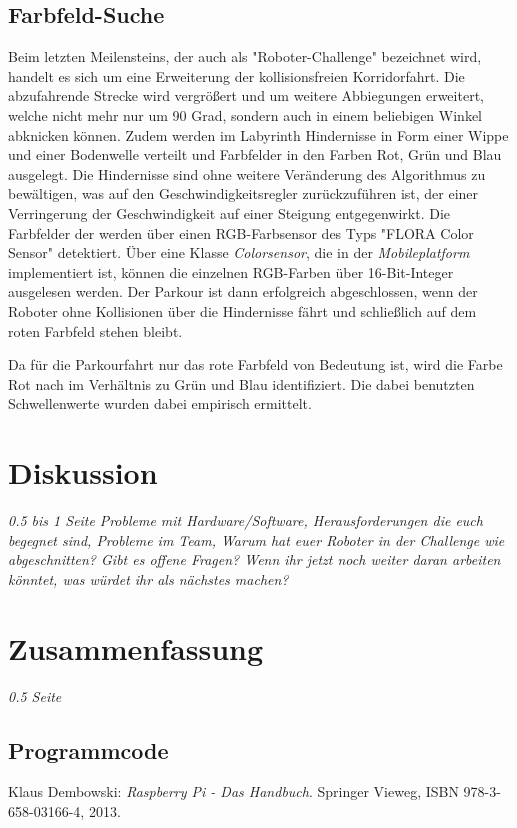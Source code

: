 \documentclass[12pt,a4paper,oneside]{article}
\begin{document}
\begin{spacing}{1.15}
\newpage

\subsection{Farbfeld-Suche}
	
Beim letzten Meilensteins, der auch als "Roboter-Challenge" bezeichnet wird, handelt es sich um eine Erweiterung der kollisionsfreien Korridorfahrt. Die abzufahrende Strecke wird vergrößert und um weitere Abbiegungen erweitert, welche nicht mehr nur um 90 Grad, sondern auch in einem beliebigen Winkel abknicken können. Zudem werden im Labyrinth Hindernisse in Form einer Wippe und einer Bodenwelle verteilt und Farbfelder in den Farben Rot, Grün und Blau ausgelegt. Die Hindernisse sind ohne weitere Veränderung des Algorithmus zu bewältigen, was auf den Geschwindigkeitsregler zurückzuführen ist, der einer Verringerung der Geschwindigkeit auf einer Steigung entgegenwirkt. Die Farbfelder der werden über einen RGB-Farbsensor des Typs "FLORA Color Sensor" detektiert. Über eine Klasse \textit{Colorsensor}, die in der \textit{Mobileplatform}  implementiert ist, können die einzelnen RGB-Farben über 16-Bit-Integer ausgelesen werden.
Der Parkour ist dann erfolgreich abgeschlossen, wenn der Roboter ohne Kollisionen über die Hindernisse fährt und schließlich auf dem roten Farbfeld stehen bleibt. 

Da für die Parkourfahrt nur das rote Farbfeld von Bedeutung ist, wird die Farbe Rot nach im Verhältnis zu Grün und Blau identifiziert. Die dabei benutzten Schwellenwerte wurden dabei empirisch ermittelt. 
	
	\section{Diskussion}
	\textit{0.5 bis 1 Seite}
	\textit{Probleme mit Hardware/Software, Herausforderungen die euch begegnet sind, Probleme im Team, Warum hat euer Roboter in der Challenge wie abgeschnitten? Gibt es offene Fragen? Wenn ihr jetzt noch weiter daran arbeiten könntet, was würdet ihr als nächstes machen?}
	
	\section{Zusammenfassung}
	\textit{0.5 Seite}
	
	
	\clearpage  
	\begin{appendix}
	\section{Programmcode}
	\end{appendix}
    \clearpage  
    \begin{thebibliography}{50}
   		 Klaus Dembowski: \textit{Raspberry Pi - Das Handbuch}. Springer Vieweg, ISBN 978-3-658-03166-4, 2013.
	\end{thebibliography}

\end{spacing}
\end{document}
